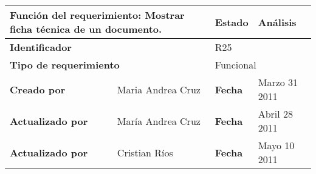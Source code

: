 %
\begin{center}
\begin{longtable}{|p{}|p{}|p{}|p{}|}
\hline
\multicolumn{2}{|p{0.45\textwidth}|}{{\bf {Función del requerimiento:}}
Mostrar ficha técnica de un documento. } & {\bf{ Estado}} & Análisis \\
\hline
\multicolumn{2}{|p{0.45\textwidth}}{\bf Identificador} &
\multicolumn{2}{|p{0.45\textwidth}|}{R25} \\
\hline
\multicolumn{2}{|p{0.45\textwidth}}{\bf {Tipo de requerimiento}} &
\multicolumn{2}{|p{0.45\textwidth}|}{Funcional}\\
\hline
\bf {Creado por} & Maria Andrea Cruz & \bf {Fecha} & Marzo 31 2011\\
\hline
\bf {Actualizado por} & María Andrea Cruz & \bf {Fecha }& Abril 28 2011\\
\hline
\bf {Actualizado por} & Cristian Ríos  & \bf {Fecha }& Mayo 10 2011\\


\end{longtable}
\end{center}
